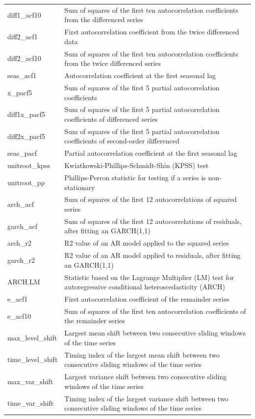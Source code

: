 \documentclass[preprint, 3p,
authoryear]{elsarticle} %
\begin{document}
\begin{table}[!h]
{\begin{tabular}[t]{ll}
diff1\_acf10 & Sum of squares of the first ten autocorrelation coefficients from the differenced series\\
diff2\_acf1 & First autocorrelation coefficient from the twice differenced data\\
diff2\_acf10 & Sum of squares of the first ten autocorrelation coefficients from the twice differenced series\\
seas\_acf1 & Autocorrelation coefficient at the first seasonal lag\\
x\_pacf5 & Sum of squares of the first 5 partial autocorrelation coefficients\\
diff1x\_pacf5 & Sum of squares of the first 5 partial autocorrelation coefficients of differenced series\\
diff2x\_pacf5 & Sum of squares of the first 5 partial autocorrelation coefficients of second-order differenced\\
seas\_pacf & Partial autocorrelation coefficient at the first seasonal lag\\
unitroot\_kpss & Kwiatkowski-Phillips-Schmidt-Shin (KPSS) test\\
unitroot\_pp & Phillips-Perron statistic for testing if a series is non-stationary\\
arch\_acf & Sum of squares of the first 12 autocorrelations of squared series\\
garch\_acf & Sum of squares of the first 12 autocorrelations of residuals, after fitting an GARCH(1,1)\\
arch\_r2 & R2 value of an AR model applied to the squared series\\
garch\_r2 & R2 value of an AR model applied to  residuals, after fitting an GARCH(1,1)\\
ARCH.LM & Statistic based on the Lagrange Multiplier (LM) test  for autoregressive conditional heteroscedasticity (ARCH)\\
e\_acf1 & First autocorrelation coefficient of the remainder series\\
e\_acf10 & Sum of squares of the first ten autocorrelation coefficients of the remainder series\\
max\_level\_shift & Largest mean shift between two consecutive sliding windows of the time series\\
time\_level\_shift & Timing index of the largest mean shift between two consecutive sliding windows of the time series\\
max\_var\_shift & Largest variance shift between two consecutive sliding windows of the time series\\
time\_var\_shift & Timing index of the largest variance shift between two consecutive sliding windows of the time series\\
\bottomrule
\end{tabular}}
\end{table}
\end{document}
